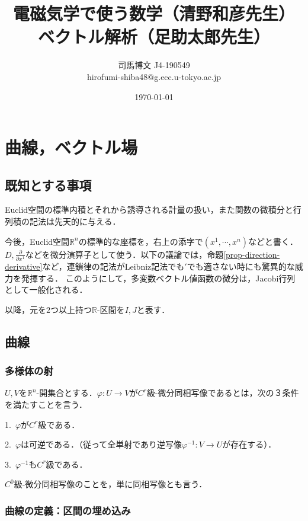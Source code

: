 \documentclass[uplatex, dvipdfmx]{jsreport}
\title{電磁気学で使う数学（清野和彦先生）\\ ベクトル解析（足助太郎先生）}
\author{司馬博文 J4-190549\\hirofumi-shiba48@g.ecc.u-tokyo.ac.jp}
\date{\today}
\begin{document}
\maketitle
\tableofcontents
\part{曲線，ベクトル場}

\chapter*{既知とする事項}
Euclid空間の標準内積とそれから誘導される計量の扱い，また関数の微積分と行列積の記法は先天的に与える．

今後，Euclid空間$\mathbb{R}^n$の標準的な座標を，右上の添字で$(x^1,\cdots,x^n)$などと書く．
$D,\frac{\partial}{\partial x^1}$などを微分演算子として使う．以下の議論では，命題\ref{prop-direction-derivative}など，連鎖律の記法がLeibniz記法でも$'$でも適さない時にも驚異的な威力を発揮する．
このようにして，多変数ベクトル値函数の微分は，Jacobi行列として一般化される．

以降，元を$2$つ以上持つ$\mathbb{R}$-区間を$I,J$と表す．

\chapter{曲線}

\section{多様体の射}

\begin{definition}\rm{}
    $U,V$を$\mathbb{R}^n$-開集合とする．$\varphi:U\to V$が$C^r$級-微分同相写像であるとは，次の３条件を満たすことを言う．

    1.\, $\varphi$が$C^r$級である．

    2.\, $\varphi$は可逆である．（従って全単射であり逆写像$\varphi^{-1}:V\to U$が存在する）．

    3.\, $\varphi^{-1}$も$C^r$級である．

    $C^0$級-微分同相写像のことを，単に同相写像とも言う．
\end{definition}

\section{曲線の定義：区間の埋め込み}
\end{document}
